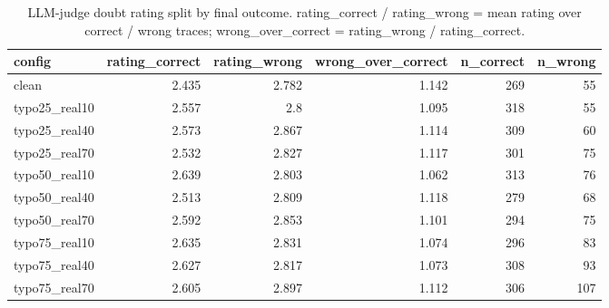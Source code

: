 \documentclass[11pt]{article}
\begin{document}
\begin{table}[H]
\centering
\caption{LLM-judge doubt rating split by final outcome. rating\_correct / rating\_wrong = mean rating over correct / wrong traces; wrong\_over\_correct = rating\_wrong / rating\_correct.}
\small
\begin{adjustbox}{max width=\textwidth}
\begin{tabular}{lrrrrr}
\toprule
\textbf{config} & \textbf{rating\_correct} & \textbf{rating\_wrong} & \textbf{wrong\_over\_correct} & \textbf{n\_correct} & \textbf{n\_wrong} \\
\midrule
clean & 2.435 & 2.782 & 1.142 & 269 & 55 \\
typo25\_real10 & 2.557 & 2.8 & 1.095 & 318 & 55 \\
typo25\_real40 & 2.573 & 2.867 & 1.114 & 309 & 60 \\
typo25\_real70 & 2.532 & 2.827 & 1.117 & 301 & 75 \\
typo50\_real10 & 2.639 & 2.803 & 1.062 & 313 & 76 \\
typo50\_real40 & 2.513 & 2.809 & 1.118 & 279 & 68 \\
typo50\_real70 & 2.592 & 2.853 & 1.101 & 294 & 75 \\
typo75\_real10 & 2.635 & 2.831 & 1.074 & 296 & 83 \\
typo75\_real40 & 2.627 & 2.817 & 1.073 & 308 & 93 \\
typo75\_real70 & 2.605 & 2.897 & 1.112 & 306 & 107 \\
\bottomrule
\end{tabular}
\end{adjustbox}
\end{table}
\end{document}
